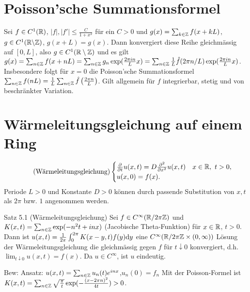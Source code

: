 \section{Poisson’sche Summationsformel}
Sei $f\in C^1(\mathbb{R})$, $|f|,|f'|\leq \frac{C}{1+x^2}$ für ein $C>0$ und $g(x) = \sum_{k\in\mathbb{Z}}f(x+kL)$, $g\in C^1(\mathbb{R}\backslash\mathbb{Z})$, $g(x+L) = g(x)$. Dann konvergiert diese Reihe gleichmässig auf $[0,L]$, also $g\in C^1(\mathbb{R}\setminus\mathbb{Z})$ und es gilt $g(x) = \sum_{n\in\mathbb{Z}}f(x+nL) = \sum_{n\in\mathbb{Z}} g_n \exp(\frac{2\pi i n}{L}x) = \sum_{n\in\mathbb{Z}}\frac1L \hat{f}(2\pi n/L) \exp(\frac{2\pi i n}{L}x)$. Insbesondere folgt für $x=0$ die Poisson'sche Summationsformel $\sum_{n\in\mathbb{Z}}f(nL) = \frac1L \sum_{n\in\mathbb{Z}} \hat{f} \left(\frac{2\pi n}{L}\right)$. Gilt allgemein für $f$ integrierbar, stetig und von beschränkter Variation.

\section{Wärmeleitungsgleichung auf einem Ring}
\begin{align*}
  \tag{Wärmeleitungsgleichung}
  \begin{cases}
    \frac{\partial}{\partial t}u(x,t) = D \frac{\partial^2}{\partial x^2} u(x,t) &  x\in\mathbb{R},\ t > 0, \\
    u(x,0) = f(x).
  \end{cases}
\end{align*}
Periode $L>0$ und Konstante $D>0$ können durch passende Substitution von $x,t$ als $2\pi$ bzw. $1$ angenommen werden.

\begin{namedtheorem}{Satz 5.1 (Wärmeleitungsgleichung)}
  Sei $f\in C^{\infty}(\mathbb{R}/2\pi\mathbb{Z})$ und $K(x,t) = \sum_{n\in\mathbb{Z}}\exp(-n^2t+inx)$ (Jacobische Theta-Funktion) für $x\in\mathbb{R}$, $t>0$. Dann ist $u(x,t)=\frac1{2\pi} \int_0^{2\pi} K(x-y,t)f(y)\mathrm{d} y$ eine $C^{\infty}(\mathbb{R}/2\pi\mathbb{Z} \times (0,\infty))$ Lösung der Wärmeleitungsgleichung die gleichmässig gegen $f$ für $t\downarrow0$ konvergiert, d.h. $\lim_{t\downarrow0} u(x,t)=f(x)$. Da $u\in C^{\infty}$, ist $u$ eindeutig.
\end{namedtheorem}

Bew: Ansatz: $u(x,t)=\sum_{n\in\mathbb{Z}}u_n(t)e^{inx}$,$u_n(0)=f_n$
Mit der Poisson-Formel ist $K(x,t)=\sum_{n\in\mathbb{Z}}\sqrt{\frac{\pi}t}\exp(-\frac{(x-2\pi n)^2}{4t})>0$.


